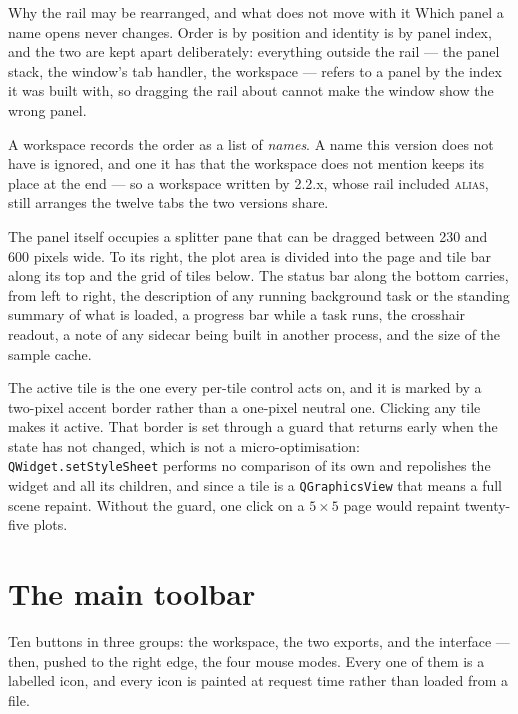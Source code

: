 \documentclass[11pt,a4paper,oneside]{report}
\newcommand{\code}[1]{\texttt{#1}}
\newcommand{\tab}[1]{\textsc{#1}}
\begin{document}
\begin{aoenote}{Why the rail may be rearranged, and what does not move with it}
Which panel a name opens never changes. Order is by position and identity is by
panel index, and the two are kept apart deliberately: everything outside the
rail --- the panel stack, the window's tab handler, the workspace --- refers to
a panel by the index it was built with, so dragging the rail about cannot make
the window show the wrong panel.

A workspace records the order as a list of \emph{names}. A name this version
does not have is ignored, and one it has that the workspace does not mention
keeps its place at the end --- so a workspace written by 2.2.x, whose rail
included \tab{alias}, still arranges the twelve tabs the two versions share.
\end{aoenote}

The
panel itself occupies a splitter pane that can be dragged between 230 and 600
pixels wide. To its right, the plot area is divided into the page and tile bar
along its top and the grid of tiles below. The status bar along the bottom
carries, from left to right, the description of any running background task or
the standing summary of what is loaded, a progress bar while a task runs, the
crosshair readout, a note of any sidecar being built in another process, and the
size of the sample cache.

The active tile is the one every per-tile control acts on, and it is marked by a
two-pixel accent border rather than a one-pixel neutral one. Clicking any tile
makes it active. That border is set through a guard that returns early when the
state has not changed, which is not a micro-optimisation:
\code{QWidget.setStyleSheet} performs no comparison of its own and repolishes
the widget and all its children, and since a tile is a \code{QGraphicsView} that
means a full scene repaint. Without the guard, one click on a $5 \times 5$ page
would repaint twenty-five plots.

\section{The main toolbar}

Ten buttons in three groups: the workspace, the two exports, and the interface
--- then, pushed to the right edge, the four mouse modes. Every one of them is a
labelled icon, and every icon is painted at request time rather than loaded from
a file.
\end{document}
